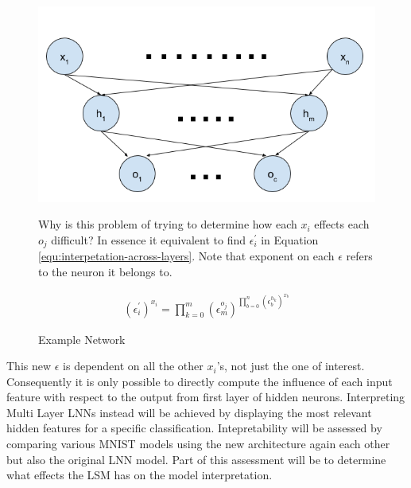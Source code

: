 \begin{figure}[H]
	\centering
	\begin{minipage}[t]{0.5\textwidth}
		\vspace{0px}
		\includegraphics[width=\textwidth]{NetworkExample.png}
		\caption{Example Network}
		\label{fig:network-example}
	\end{minipage}
	\hspace{1px}
	\begin{minipage}[t]{0.45\textwidth}
		\vspace{2px}
	Why is this problem of trying to determine how each $x_i$ effects each $o_j$ difficult? In essence it equivalent to find $\epsilon^{'}_i$ in Equation \ref{equ:interpetation-across-layers}. Note that exponent on each $\epsilon$ refers to the neuron it belongs to.

		\begin{align}
			(\epsilon^{'}_i)^{x_i} = \prod_{k = 0}^{m} (\epsilon^{o_j}_m)^{\prod_{b = 0}^{n} (\epsilon^{h_k}_b)^{x_b}}
			\label{equ:interpetation-across-layers}
		\end{align}
	\end{minipage}
	\hfill
\end{figure}

This new $\epsilon$ is dependent on all the other $x_i$'s, not just the one of interest. Consequently it is only possible to directly compute the influence of each input feature with respect to the output from first layer of hidden neurons. Interpreting Multi Layer LNNs instead will be achieved by displaying the most relevant hidden features for a specific classification. Intepretability will be assessed by comparing various MNIST models using the new architecture again each other but also the original LNN model. Part of this assessment will be to determine what effects the LSM has on the model interpretation.

